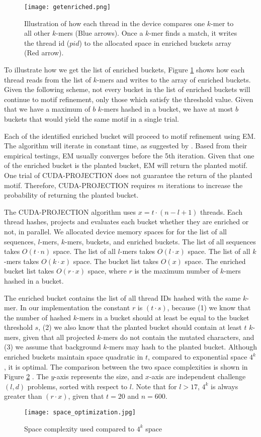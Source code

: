 \documentclass{llncs}
\begin{document}
{\begin{figure}[h]
\centering
\texttt{[image: getenriched.png]}
\caption{Illustration of how each thread in the device compares one $k$-mer to all other $k$-mers (Blue arrows). Once a $k$-mer finds a match, it writes the thread id ($pid$) to the allocated space in enriched buckets array (Red arrow). }
\label{getEnriched}
\end{figure}
To illustrate how we get the list of enriched buckets, Figure \ref{getEnriched} shows how each thread reads from the list of $k$-mers  and writes to the  array of enriched buckets. Given the following scheme, not every bucket in the list of enriched buckets will continue to motif refinement, only those which satisfy the threshold value.  Given that we have a maximum of $b$ $k$-mers hashed in a bucket, we have at most $b$ buckets that would yield the same motif in a single trial. 

Each of the identified enriched bucket will proceed to motif refinement using EM. The algorithm will iterate in constant time,  as suggested by \cite{tompa}. Based from their empirical testings, EM usually converges before the 5th iteration. Given that one of the enriched bucket is the planted bucket, EM will return the planted motif. 
One trial of CUDA-PROJECTION does not guarantee the return of the planted motif.  Therefore, CUDA-PROJECTION requires $m$ iterations to  increase the probability of returning the planted bucket.

The CUDA-PROJECTION algorithm uses $x=  t \cdot (n - l +1) $ threads. Each thread hashes, projects and evaluates each bucket whether they are  enriched or not, in parallel. We allocated device memory spaces for  for the list of all sequences, $l$-mers, $k$-mers, buckets, and enriched buckets. The list of all sequences takes $O(t \cdot n)$ space. The list of all $l$-mers takes $O(l \cdot x)$ space.  The list of all $k$-mers takes $O(k \cdot x)$ space. The bucket  list takes  $O(x)$ space. The enriched bucket list takes $O( r \cdot x)$ space, where $r$ is the maximum number  of $k$-mers hashed in a bucket.


The enriched bucket contains the list of all thread IDs hashed with the same $k$-mer. In our implementation the constant  $r$ is  $(t\cdot s)$, because (1) we know that the number of hashed $k$-mers in a bucket should at least be equal to the bucket threshold $s$, (2)  we also know that the planted bucket should contain at least $t$ $k$-mers, given that all projected $k$-mers do not contain the mutated characters, and (3) we assume that  background $k$-mers may hash to the planted bucket. Although enriched buckets maintain space quadratic in $t$, compared to exponential space $4^k$, it is optimal. The comparison between the two space complexities is shown in Figure \ref{spaceComparison}	. The $y$-axis represents the size, and $x$-axis are independent challenge $(l,d)$ problems, sorted with respect to $l$. Note that for $ l > 17$, $4^k$ is always greater than  $(r \cdot x)$, given that $t=20$ and $n=600$.
 \begin{figure}
 \centering
 \texttt{[image: space\_optimization.jpg]}
\caption{Space complexity used compared to $4^k$ space} 
\label{spaceComparison}
 \end{figure}

}
\end{document}
